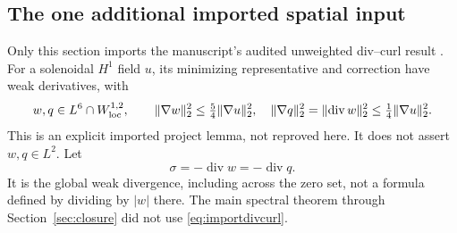 \documentclass[11pt,a4paper]{article}
\theoremstyle{definition}\newtheorem{definition}[theorem]{Definition}
\theoremstyle{remark}\newtheorem{remark}[theorem]{Remark}
\newcommand{\norm}[1]{\lVert #1\rVert}
\newcommand{\diver}{\operatorname{div}}
\numberwithin{equation}{section}
\begin{document}
\subsection{The one additional imported spatial input}
Only this section imports the manuscript's audited unweighted div--curl result \cite{Paper,HF25}. For a solenoidal $H^1$ field $u$, its minimizing representative and correction have weak derivatives, with
\begin{equation}\label{eq:importdivcurl}
 w,q\in L^6\cap W^{1,2}_{\rm loc},\qquad
 \norm{\nabla w}_2^2\le\tfrac54\norm{\nabla u}_2^2,\quad
 \norm{\nabla q}_2^2=\norm{\diver w}_2^2\le\tfrac14\norm{\nabla u}_2^2.
\end{equation}
This is an explicit imported project lemma, not reproved here. It does not assert $w,q\in L^2$. Let
\begin{equation}\label{eq:sigmadef}
 \sigma=-\diver w=-\diver q.
\end{equation}
It is the global weak divergence, including across the zero set, not a formula defined by dividing by $|w|$ there. The main spectral theorem through Section~\ref{sec:closure} did not use \eqref{eq:importdivcurl}.
\end{document}
